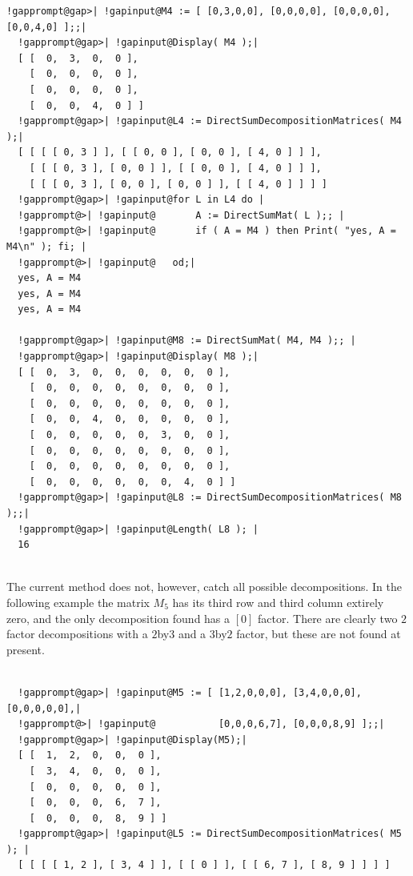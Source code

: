 \documentclass[a4paper,11pt]{report}
\begin{document}
{{\begin{Verbatim}[commandchars=!@|,fontsize=\small,frame=single,label=Example]
  !gapprompt@gap>| !gapinput@M4 := [ [0,3,0,0], [0,0,0,0], [0,0,0,0], [0,0,4,0] ];;|
  !gapprompt@gap>| !gapinput@Display( M4 );|
  [ [  0,  3,  0,  0 ],
    [  0,  0,  0,  0 ],
    [  0,  0,  0,  0 ],
    [  0,  0,  4,  0 ] ]
  !gapprompt@gap>| !gapinput@L4 := DirectSumDecompositionMatrices( M4 );|
  [ [ [ [ 0, 3 ] ], [ [ 0, 0 ], [ 0, 0 ], [ 4, 0 ] ] ], 
    [ [ [ 0, 3 ], [ 0, 0 ] ], [ [ 0, 0 ], [ 4, 0 ] ] ], 
    [ [ [ 0, 3 ], [ 0, 0 ], [ 0, 0 ] ], [ [ 4, 0 ] ] ] ]
  !gapprompt@gap>| !gapinput@for L in L4 do |
  !gapprompt@>| !gapinput@       A := DirectSumMat( L );; |
  !gapprompt@>| !gapinput@       if ( A = M4 ) then Print( "yes, A = M4\n" ); fi; |
  !gapprompt@>| !gapinput@   od;|
  yes, A = M4
  yes, A = M4
  yes, A = M4
  
  !gapprompt@gap>| !gapinput@M8 := DirectSumMat( M4, M4 );; |
  !gapprompt@gap>| !gapinput@Display( M8 );|
  [ [  0,  3,  0,  0,  0,  0,  0,  0 ],
    [  0,  0,  0,  0,  0,  0,  0,  0 ],
    [  0,  0,  0,  0,  0,  0,  0,  0 ],
    [  0,  0,  4,  0,  0,  0,  0,  0 ],
    [  0,  0,  0,  0,  0,  3,  0,  0 ],
    [  0,  0,  0,  0,  0,  0,  0,  0 ],
    [  0,  0,  0,  0,  0,  0,  0,  0 ],
    [  0,  0,  0,  0,  0,  0,  4,  0 ] ]
  !gapprompt@gap>| !gapinput@L8 := DirectSumDecompositionMatrices( M8 );;|
  !gapprompt@gap>| !gapinput@Length( L8 ); |
  16
  
\end{Verbatim}
 

 The current method does not, however, catch all possible decompositions. In
the following example the matrix $M_5$ has its third row and third column extirely zero, and the only decomposition
found has a $[0]$ factor. There are clearly two $2$\texttt{}factor decompositions with a $2$\texttt{}by\texttt{}$3$ and a $3$\texttt{}by\texttt{}$2$ factor, but these are not found at present. 

 
\begin{Verbatim}[commandchars=!@|,fontsize=\small,frame=single,label=Example]
  
  !gapprompt@gap>| !gapinput@M5 := [ [1,2,0,0,0], [3,4,0,0,0], [0,0,0,0,0],|
  !gapprompt@>| !gapinput@           [0,0,0,6,7], [0,0,0,8,9] ];;|
  !gapprompt@gap>| !gapinput@Display(M5);|
  [ [  1,  2,  0,  0,  0 ],
    [  3,  4,  0,  0,  0 ],
    [  0,  0,  0,  0,  0 ],
    [  0,  0,  0,  6,  7 ],
    [  0,  0,  0,  8,  9 ] ]
  !gapprompt@gap>| !gapinput@L5 := DirectSumDecompositionMatrices( M5 ); |
  [ [ [ [ 1, 2 ], [ 3, 4 ] ], [ [ 0 ] ], [ [ 6, 7 ], [ 8, 9 ] ] ] ]
  
\end{Verbatim}
 }

 }
\end{document}
